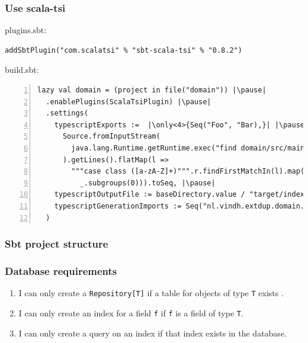 \documentclass[aspectratio=169]{beamer}
\begin{document}
\begin{frame}[fragile]
\frametitle{Use scala-tsi}

plugins.sbt:
\begin{lstlisting}[style=myScalaStyle,frame=none]
addSbtPlugin("com.scalatsi" % "sbt-scala-tsi" % "0.8.2")
\end{lstlisting}
\pause
build.sbt:
\begin{lstlisting}[style=myScalaStyle,frame=none, numbers=left,escapeinside=||]
lazy val domain = (project in file("domain")) |\pause|
  .enablePlugins(ScalaTsiPlugin) |\pause|
  .settings(
    typescriptExports :=  |\only<4>{Seq("Foo", "Bar),}| |\pause|
      Source.fromInputStream(
        java.lang.Runtime.getRuntime.exec("find domain/src/main/scala/ -type f -exec cat {} +").getInputStream
      ).getLines().flatMap(l => 
        """case class ([a-zA-Z]+)""".r.findFirstMatchIn(l).map(
          _.subgroups(0))).toSeq, |\pause|
    typescriptOutputFile := baseDirectory.value / "target/index.d.ts",
    typescriptGenerationImports := Seq("nl.vindh.extdup.domain._")
  )

\end{lstlisting}

\end{frame}

\begin{frame}[fragile]
\frametitle{Sbt project structure}

\end{frame}

\begin{frame}
\frametitle{Database requirements}

\begin{enumerate}
\item I can only create a \texttt{Repository[T]} if a table for objects of type \texttt{T} exists .
\item I can only create an index for a field \texttt{f} if \texttt{f} is a field of type \texttt{T}.
\item I can only create a query on an index if that index exists in the database.


\end{enumerate}

\end{frame}
\end{document}
